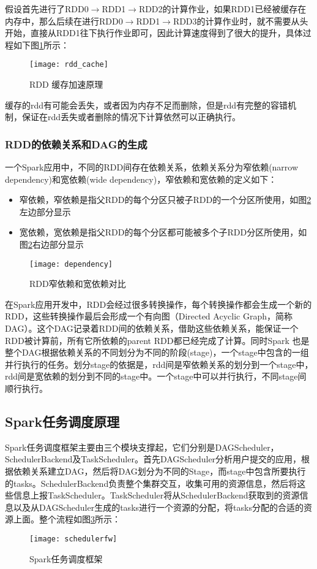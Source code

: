 假设首先进行了RDD0$\rightarrow$RDD1$\rightarrow$RDD2的计算作业，如果RDD1已经被缓存在内存中，那么后续在进行RDD0$\rightarrow$RDD1$\rightarrow$RDD3的计算作业时，就不需要从头开始，直接从RDD1往下执行作业即可，因此计算速度得到了很大的提升，具体过程如下图\ref{fig:rdd_cache}所示：
\begin{figure}[htp]
\centering
\texttt{[image: rdd\_cache]}
\caption{RDD 缓存加速原理}
\label{fig:rdd_cache}
\end{figure}

缓存的rdd有可能会丢失，或者因为内存不足而删除，但是rdd有完整的容错机制，保证在rdd丢失或者删除的情况下计算依然可以正确执行。
\subsubsection{RDD的依赖关系和DAG的生成}
一个Spark应用中，不同的RDD间存在依赖关系，依赖关系分为窄依赖(narrow dependency)和宽依赖(wide dependency)，窄依赖和宽依赖的定义如下：
\begin{itemize}
\item 窄依赖，窄依赖是指父RDD的每个分区只被子RDD的一个分区所使用，如图\ref{fig:dependency}左边部分显示
\item 宽依赖，宽依赖是指父RDD的每个分区都可能被多个子RDD分区所使用，如图\ref{fig:dependency}右边部分显示
\end{itemize}
\begin{figure}[htp]
\centering
\texttt{[image: dependency]}
\caption{RDD窄依赖和宽依赖对比}
\label{fig:dependency}
\end{figure}
在Spark应用开发中，RDD会经过很多转换操作，每个转换操作都会生成一个新的RDD，这些转换操作最后会形成一个有向图（Directed Acyclic Graph，简称DAG）。这个DAG记录着RDD间的依赖关系，借助这些依赖关系，能保证一个RDD被计算前，所有它所依赖的parent RDD都已经完成了计算。同时Spark 也是整个DAG根据依赖关系的不同划分为不同的阶段(stage)，一个stage中包含的一组并行执行的任务。划分stage的依据是，rdd间是窄依赖关系的划分到一个stage中，rdd间是宽依赖的划分到不同的stage中。一个stage中可以并行执行，不同stage间顺行执行。
\subsection{Spark任务调度原理}
Spark任务调度框架主要由三个模块支撑起，它们分别是DAGScheduler，SchedulerBackend及TaskScheduler。首先DAGScheduler分析用户提交的应用，根据依赖关系建立DAG，然后将DAG划分为不同的Stage，而stage中包含所要执行的tasks。SchedulerBackend负责整个集群交互，收集可用的资源信息，然后将这些信息上报TaskScheduler。TaskScheduler将从SchedulerBackend获取到的资源信息以及从DAGScheduler生成的tasks进行一个资源的分配，将tasks分配的合适的资源上面。整个流程如图\ref{fig:schedulerfw}所示：
\begin{figure}[htp]
\centering
\texttt{[image: schedulerfw]}
\caption{Spark任务调度框架}
\label{fig:schedulerfw}
\end{figure}
